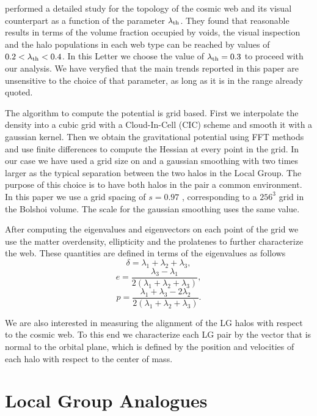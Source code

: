 \documentclass{emulateapj}
\newcommand{\hMpc}{{\ifmmode{h^{-1}{\rm Mpc}}\else{$h^{-1}$Mpc }\fi}}
\begin{document}
\cite{Tweb} performed a detailed study for the topology of the
cosmic web and its visual counterpart as a function of the parameter
$\lambda_{\rm th}$. They found that reasonable results in terms of the
volume fraction occupied by voids, the visual inspection and the halo
populations in each web type can be reached by values of $0.2<\lambda_{\rm
th}<0.4$. In this Letter we choose the value of $\lambda_{\rm
  th}=0.3$ to proceed with our analysis. We have veryfied that the
main trends reported in this paper are unsensitive to the choice of
that parameter, as long as it is in the range already quoted.

The algorithm to compute the potential is grid based. First we
interpolate the density into a cubic grid with a Cloud-In-Cell (CIC)
scheme and smooth it with a gaussian kernel. Then we obtain the
gravitational potential using FFT methods and use finite differences
to compute the Hessian at every point in the grid. In our case we have
used a grid size on and a gaussian smoothing with two times larger as
the typical separation between the two halos in the Local Group. The
purpose of this choice is to have both halos in the pair a common
environment. In this paper we use a grid spacing of $s=0.97$ \hMpc,
corresponding to a $256^3$ grid in the Bolshoi volume. The scale for
the gaussian smoothing uses the same value.


After computing the eigenvalues and eigenvectors on each point of the
grid we use the matter overdensity, ellipticity and the prolatenes to
further characterize the web. These quantities are defined in terms of the
eigenvalues as follows 
%
\begin{equation}
\delta = \lambda_1 + \lambda_2 + \lambda_3,
\end{equation}
%
\begin{equation}
e= \frac{\lambda_3 - \lambda_1}{2(\lambda_1 + \lambda_2 + \lambda_3)}, 
\end{equation}
%
\begin{equation}
p= \frac{\lambda_1 + \lambda_3 - 2\lambda_2}{2(\lambda_1 + \lambda_2 +
  \lambda_3)}.
\end{equation}

We are also interested in measuring the alignment of the LG halos with
respect to the cosmic web. To this end we characterize each LG pair by
the vector that is normal to the orbital plane, which is defined by
the position and velocities of each halo with respect to the center of
mass. 


\section{Local Group Analogues}
\label{sec:lg_analogues}
\end{document}
